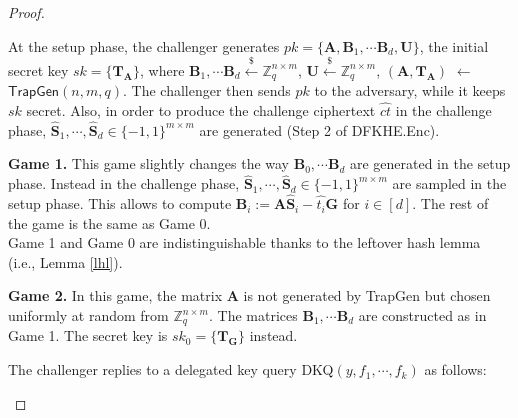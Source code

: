 \documentclass[runningheads,10pt]{llncs}
\begin{document}
\begin{proof}
\begin{description}
		At the setup phase, the challenger generates $pk=\{\textbf{A},\textbf{B}_1, \cdots \textbf{B}_d , \textbf{U}\}$, 
		the initial secret key $sk=\{\textbf{T}_\textbf{A}\}$, where $\textbf{B}_1, \cdots \textbf{B}_d \xleftarrow{\$} \mathbb{Z}_q^{n \times m}$, 
		$\textbf{U} \xleftarrow{\$} \mathbb{Z}_q^{n\times m}$, $(\textbf{A}, \textbf{T}_\textbf{A})$ $\leftarrow$ $\textsf{TrapGen}(n,m,q)$. 
		The challenger then sends $pk$ to the adversary, while it keeps $sk$ secret. 
		Also, in order to produce the challenge ciphertext $\widehat{ct}$ in the challenge phase, 
		$\widehat{\textbf{S}}_1, \cdots, \widehat{\textbf{S}}_{d} \in \{-1,1\}^{m \times m}$ are generated (Step 2 of \textsf{DFKHE.Enc}). 
		\item \textbf{Game 1.} This game slightly changes the way $\textbf{B}_0, \cdots \textbf{B}_d$ are generated in the setup phase. 
		Instead in the challenge phase, $\widehat{\textbf{S}}_1, \cdots, \widehat{\textbf{S}}_{d} \in \{-1,1\}^{m \times m}$ are sampled in the setup phase.
		This allows to compute $\textbf{B}_i:=\textbf{A}\widehat{\textbf{S}}_i-\widehat{t_i}\textbf{G}$ for $i\in [d]$.
		The rest of the game is the same as Game 0. \\
		Game 1 and Game 0 are indistinguishable thanks to the leftover hash lemma (i.e., Lemma \ref{lhl}).
		\item  \textbf{Game 2.} In this game,  the matrix $\textbf{A}$ is not generated by \textsf{TrapGen} 
		but chosen uniformly at random from $\mathbb{Z}_q^{n \times m}$. 
		The matrices $\textbf{B}_1, \cdots \textbf{B}_d$ are constructed as in Game 1. 
		The secret key is $sk_0=\{\textbf{T}_\textbf{G}\}$ instead. 
		
		The challenger replies to a delegated key query DKQ$(y, f_1,\cdots, f_k)$ as follows:
		

\end{description}
\end{proof}
\end{document}
